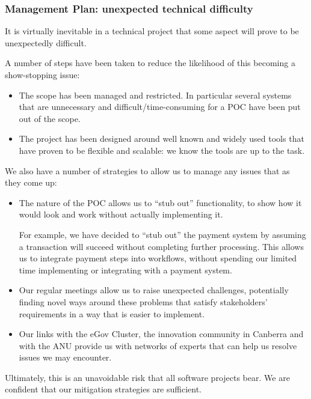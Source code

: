 \documentclass[12pt,a4paper,twosided]{article}
\begin{document}
\subsubsection{Management Plan: unexpected technical difficulty}

It is virtually inevitable in a technical project that some aspect will
prove to be unexpectedly difficult.

A number of steps have been taken to reduce the likelihood of this
becoming a show-stopping issue:

\begin{itemize}
\itemsep1pt\parskip0pt
\item
  The scope has been managed and restricted. In particular several
  systems that are unnecessary and difficult/time-consuming for a POC
  have been put out of the scope.
\item
  The project has been designed around well known and widely used tools
  that have proven to be flexible and scalable: we know the tools are up
  to the task.
\end{itemize}

We also have a number of strategies to allow us to manage any issues
that as they come up:

\begin{itemize}
\item
  The nature of the POC allows us to ``stub out'' functionality, to show
  how it would look and work without actually implementing it.

  For example, we have decided to ``stub out'' the payment system by
  assuming a transaction will succeed without completing further
  processing. This allows us to integrate payment steps into workflows,
  without spending our limited time implementing or integrating with a
  payment system.
\item
  Our regular meetings allow us to raise unexpected challenges,
  potentially finding novel ways around these problems that satisfy
  stakeholders' requirements in a way that is easier to implement.
\item
  Our links with the eGov Cluster, the innovation community in Canberra
  and with the ANU provide us with networks of experts that can help us
  resolve issues we may encounter.
\end{itemize}

Ultimately, this is an unavoidable risk that all software projects bear.
We are confident that our mitigation strategies are sufficient.
\end{document}
